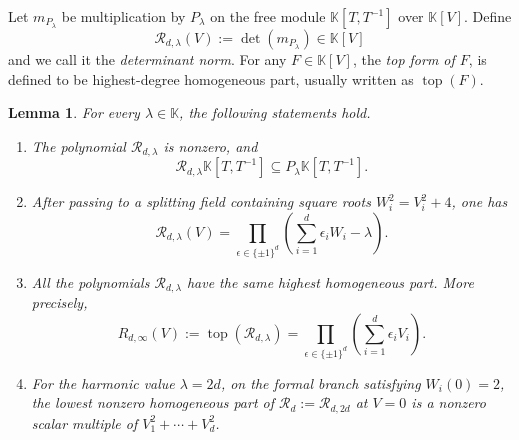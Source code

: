 \documentclass[11pt,reqno]{amsart}
\newcommand\K{\ensuremath{\mathbb{K}}}
\newtheorem{lemma}[theorem]{Lemma}
\theoremstyle{definition}
\theoremstyle{plain}
\numberwithin{equation}{section}
\begin{document}
Let $m_{P_\lambda}$ be multiplication by $P_\lambda$ on the free module $\K[T,T^{-1}]$ over $\K[V]$. Define 
\begin{equation*}
    \mathcal{R}_{d,\lambda}(V):=\det (m_{P_\lambda})\in \K[V]
\end{equation*}
and we call it the \emph{determinant norm}.
For any $F\in \K[V]$, the \emph{top form of $F$}, is defined to be highest-degree homogeneous part, usually written as $\operatorname{top}(F)$.


\begin{lemma}\label{lem:norm-identities}
For every $\lambda\in \K$, the following statements hold.
\begin{enumerate}
    \item The polynomial $\mathcal{R}_{d,\lambda}$ is nonzero, and
    \begin{equation*}
        \mathcal{R}_{d,\lambda}\K[T,T^{-1}]
        \subseteq
        P_\lambda\K[T,T^{-1}].
    \end{equation*}

    \item After passing to a splitting field containing square roots
    $W_i^2=V_i^2+4$, one has
    \begin{equation*}
        \mathcal{R}_{d,\lambda}(V)
        =
        \prod_{\epsilon\in\{\pm1\}^d}
        \left(
            \sum_{i=1}^d \epsilon_i W_i-\lambda
        \right).
    \end{equation*}

    \item All the polynomials $\mathcal{R}_{d,\lambda}$ have the same highest
    homogeneous part. More precisely,
    \begin{equation*}
        R_{d,\infty}(V):=\operatorname{top}(\mathcal{R}_{d,\lambda})=\prod_{\epsilon\in\{\pm1\}^d}
        \left(
            \sum_{i=1}^d \epsilon_i V_i
        \right).
    \end{equation*}

    \item For the harmonic value $\lambda=2d$, on the formal branch
    satisfying $W_i(0)=2$, the lowest nonzero homogeneous part of
    $\mathcal{R}_d:=\mathcal{R}_{d,2d}$ at $V=0$ is a nonzero scalar multiple of $V_1^2+\cdots+V_d^2$.
\end{enumerate}
\end{lemma}
\end{document}
